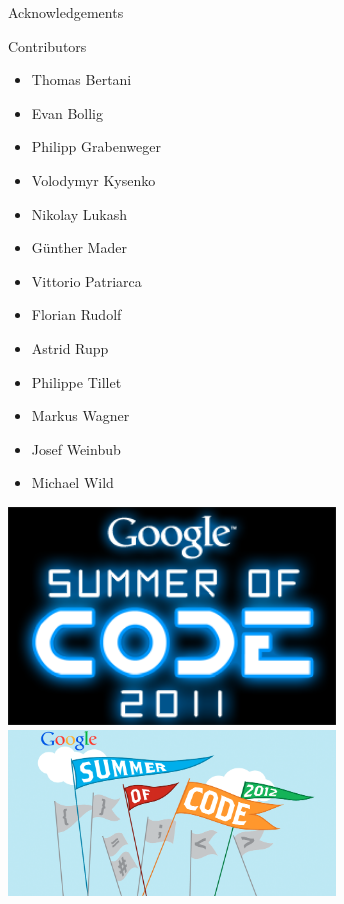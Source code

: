 

\begin{frame}{Acknowledgements}

 \begin{minipage}{0.5\textwidth}
  \begin{block}{Contributors}
    \begin{itemize}
     \item Thomas Bertani
     \item Evan Bollig
     \item Philipp Grabenweger
     \item Volodymyr Kysenko
     \item Nikolay Lukash
     \item G\"unther Mader
     \item Vittorio Patriarca
     \item Florian Rudolf
     \item Astrid Rupp
     \item Philippe Tillet
     \item Markus Wagner
     \item Josef Weinbub
     \item Michael Wild
    \end{itemize}
  \end{block}
 \end{minipage}
 \begin{minipage}{0.4\textwidth}
  \includegraphics[width=0.65\textwidth]{figures/gsoc2011.png}
  \vspace*{0.2cm} \\
  \includegraphics[width=0.65\textwidth]{figures/gsoc2012.png}

\end{minipage}
\end{frame}
